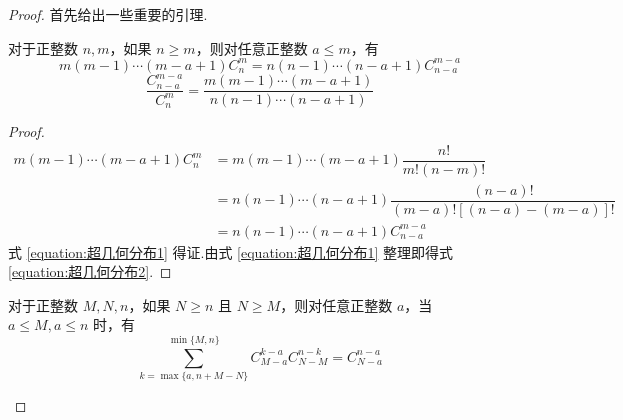 \begin{proof}
    首先给出一些重要的引理.

    \vspace{0.5em}

    \begin{lemma} \label{lemma:超几何分布1}
        \indent 对于正整数 $n,m$，如果 $n \geqslant m$，则对任意正整数 $a \leqslant m$，有
        \begin{equation} \label{equation:超几何分布1}
            m(m-1) \cdots (m-a+1) C_n^m = n(n-1) \cdots (n-a+1) C_{n-a}^{m-a}
        \end{equation}
        \begin{equation} \label{equation:超几何分布2}
            \dfrac{C_{n-a}^{m-a}}{C_n^m} = \dfrac{m(m-1) \cdots (m-a+1)}{n(n-1) \cdots (n-a+1)}
        \end{equation}
    \end{lemma}

    \vspace{-1em}

    \begin{proof}
        $$
        \begin{aligned}
            m(m-1) \cdots (m-a+1) C_n^m &= m(m-1) \cdots (m-a+1) \dfrac{n!}{m! (n-m)!} \\
            &= n(n-1) \cdots (n-a+1) \dfrac{(n-a)!}{(m-a)! [(n-a) - (m-a)]!} \\
            &= n(n-1) \cdots (n-a+1) C_{n-a}^{m-a}
        \end{aligned}
        $$
        式 \eqref{equation:超几何分布1} 得证.由式 \eqref{equation:超几何分布1} 整理即得式 \eqref{equation:超几何分布2}.
    \end{proof}

    \begin{lemma} \label{lemma:超几何分布2}
        \indent 对于正整数 $M,N,n$，如果 $N \geqslant n$ 且 $N \geqslant M$，则对任意正整数 $a$，当 $a \leqslant M, a \leqslant n$ 时，有
        \begin{equation} \label{equation:超几何分布3}
            \sum_{k=\max\{ a, n+M-N \}}^{\min\{ M,n \}} C_{M-a}^{k-a} C_{N-M}^{n-k} = C_{N-a}^{n-a}
        \end{equation}
    \end{lemma}


\end{proof}
